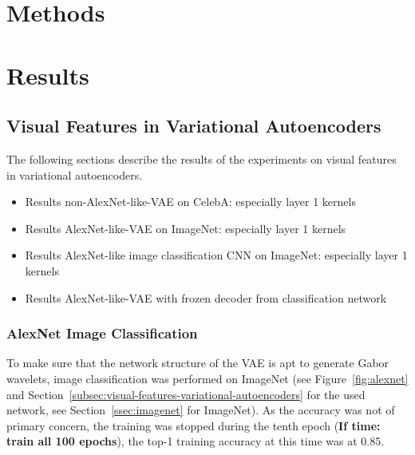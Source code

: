 \documentclass[11pt]{article}
\begin{document}
    \section{Methods}\label{sec:methods}
    


    \section{Results}\label{sec:results}

    \subsection{Visual Features in Variational Autoencoders}\label{subsec:results_visual_features_in_variational_autoencoders}
    The following sections describe the results of the experiments on visual features in variational autoencoders.

    \begin{itemize}
        \item Results non-AlexNet-like-VAE on CelebA: especially layer 1 kernels
        \item Results AlexNet-like-VAE on ImageNet: especially layer 1 kernels
        \item Results AlexNet-like image classification CNN on ImageNet: especially layer 1 kernels
        \item Results AlexNet-like-VAE with frozen decoder from classification network
    \end{itemize}

    \subsubsection{AlexNet Image Classification}
    To make sure that the network structure of the \ac{VAE} is apt to generate Gabor wavelets, image classification was performed on ImageNet (see Figure~\ref{fig:alexnet} and Section~\ref{subsec:visual-features-variational-autoencoders} for the used network, see Section~\ref{ssec:imagenet} for ImageNet).
    As the accuracy was not of primary concern, the training was stopped during the tenth epoch (\textbf{If time: train all 100 epochs}), the top-1 training accuracy at this time was at 0.85.
\end{document}
